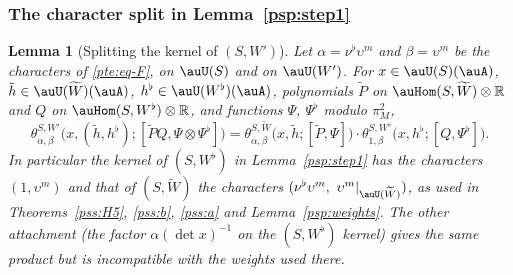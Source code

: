 \documentclass[10pt]{amsart}
\newtheorem{lemma}[theorem]{Lemma}
\theoremstyle{definition}
\theoremstyle{remark}
\newcommand{\R}{\mathbb R}
\begin{document}
\subsubsection{The character split in Lemma~\ref{psp:step1}}\label{psv:ss-split}

\begin{lemma}[Splitting the kernel of $(S,W')$]\label{psv:split}
Let $\alpha=\nu^\flat\upsilon^m$ and $\beta=\upsilon^m$ be the characters of \eqref{pte:eq-F}, on $\auU(S)$ and on $\auU(W')$. For
$x\in\auU(S)(\auA)$, $\tilde h\in\auU(\widetilde W)(\auA)$, $h^\flat\in\auU(W^\flat)(\auA)$, polynomials $\widetilde P$ on
$\auHom(S,\widetilde W)\otimes\R$ and $Q$ on $\auHom(S,W^\flat)\otimes\R$, and functions $\Psi$, $\Psi^\flat$ modulo $\pi_M^2$,
\[
\theta^{S,W'}_{\alpha,\beta}\bigl(x,(\tilde h,h^\flat);[\widetilde PQ,\Psi\otimes\Psi^\flat]\bigr)=
\theta^{S,\widetilde W}_{\alpha,\beta}\bigl(x,\tilde h;[\widetilde P,\Psi]\bigr)\cdot\theta^{S,W^\flat}_{1,\beta}\bigl(x,h^\flat;[Q,\Psi^\flat]\bigr).
\]
In particular the kernel of $(S,W^\flat)$ in Lemma~\ref{psp:step1} has the characters $(1,\upsilon^m)$ and that of
$(S,\widetilde W)$ the characters $(\nu^\flat\upsilon^m,\ \upsilon^m|_{\auU(\widetilde W)})$, as used in
Theorems~\ref{pss:H5}, \ref{pss:b}, \ref{pss:a} and Lemma~\ref{psp:weights}. The other attachment (the factor
$\alpha(\det x)^{-1}$ on the $(S,W^\flat)$ kernel) gives the same product but is incompatible with the weights used there.
\end{lemma}
\end{document}
